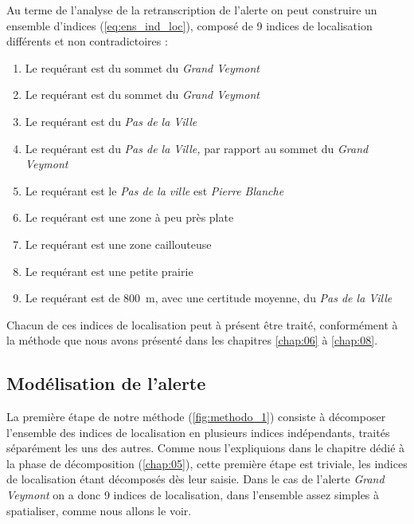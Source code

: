 Au terme de l'analyse de la retranscription de l'alerte on peut
construire un ensemble d'indices (\autoref{eq:ens_ind_loc}), composé
de 9 indices de localisation différents et non contradictoires :
%
\begin{enumerate}
\item Le requérant est  du sommet
  du \emph{Grand Veymont}
\item Le requérant est  du sommet du
  \emph{Grand Veymont}
\item Le requérant est  du \emph{Pas
    de la Ville}
\item Le requérant est  du \emph{Pas de la Ville,} par
  rapport au sommet du \emph{Grand Veymont}
\item Le requérant est  le \emph{Pas de la ville}
  est \emph{Pierre Blanche}
\item Le requérant est  une zone à peu
  près plate
\item Le requérant est  une zone
  caillouteuse
\item Le requérant est  une petite
  prairie
\item Le requérant est  de
  \SI{800}{\meter}, avec une certitude moyenne, du \emph{Pas de la
    Ville}
\end{enumerate}

Chacun de ces indices de localisation peut à présent être traité,
conformément à la méthode que nous avons présenté dans les chapitres
\ref{chap:06} à \ref{chap:08}.

\subsection{Modélisation de l'alerte}
\label{subsec:9-2-2}

La première étape de notre méthode (\autoref{fig:methodo_1}) consiste
à décomposer l'ensemble des indices de localisation en plusieurs
indices indépendants, traités séparément les uns des autres. Comme
nous l'expliquions dans le chapitre dédié à la phase de décomposition
(\autoref{chap:05}), cette première étape est triviale, les indices de
localisation étant décomposés dès leur saisie. Dans le cas de l'alerte
\emph{Grand Veymont} on a donc 9 indices de localisation, dans
l'ensemble assez simples à spatialiser, comme nous allons le voir.

